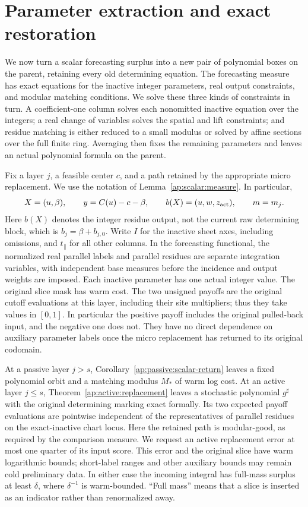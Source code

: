 \section{Parameter extraction and exact restoration}\label{ap:extraction}

We now turn a scalar forecasting surplus into a new pair of polynomial
boxes on the parent, retaining every old determining equation.  The
forecasting measure has exact equations for the inactive integer
parameters, real output constraints, and modular matching conditions.
We solve these three kinds of constraints in turn.  A coefficient-one
column solves each nonomitted inactive equation over the integers; a real
change of variables solves the spatial and lift constraints; and residue
matching is either reduced to a small modulus or solved by affine
sections over the full finite ring.  Averaging then fixes the remaining
parameters and leaves an actual polynomial formula on the parent.

Fix a layer $j$, a feasible center $c$, and a path retained by the
appropriate micro replacement.  We use the notation of
Lemma~\ref{ap:scalar:measure}.  In particular,
\[
 X=(u,\beta),\qquad y=C(u)-c-\beta,\qquad
 b(X)=(u,w,z_{\rm act}),\qquad m=m_j.
\]
Here $b(X)$ denotes the integer residue output, not the current raw
determining block, which is $b_j=\beta+b_{j,0}$.
Write $I$ for the inactive sheet axes, including omissions, and
$t_\parallel$ for all other columns.  In the forecasting functional,
the normalized real parallel labels and parallel residues are separate
integration variables, with independent base measures before the
incidence and output weights are imposed.  Each inactive parameter has
one actual integer value.  The original slice mask has warm
cost.  The two unsigned payoffs are the original cutoff evaluations at
this layer, including their site multipliers; thus they take values in
$[0,1]$.  In particular the positive payoff includes the original
pulled-back input, and the negative one does not.  They have no direct
dependence on auxiliary parameter labels once the micro replacement has
returned to its original codomain.

At a passive layer $j>s$, Corollary~\ref{ap:passive:scalar-return}
leaves a fixed polynomial orbit and a matching
modulus $M_*$ of warm log cost.  At an active layer $j\le s$,
Theorem~\ref{ap:active:replacement} leaves a stochastic polynomial
$g^\sharp$ with the original determining marking exact formally.  Its
two expected payoff evaluations are pointwise independent of the
representatives of parallel residues on the exact-inactive chart locus.
Here the retained path is modular-good, as required by the comparison
measure.  We request an active replacement error at most one quarter
of its input score.  This error and the original slice have warm
logarithmic bounds; short-label ranges and other auxiliary bounds may
remain cold preliminary data.
In either case the incoming integral has full-mass surplus at least
$\delta$, where $\delta^{-1}$ is warm-bounded.  ``Full mass'' means
that a slice is inserted as an indicator rather than renormalized away.

